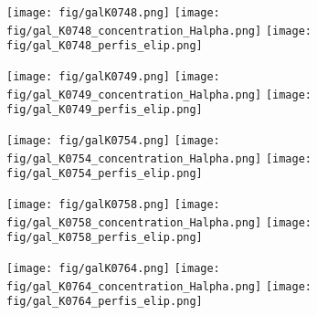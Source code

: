 \begin{figure}[!ht]
\begin{center}
\setcaptionmargin{1cm}
\texttt{[image: fig/galK0748.png]}
\texttt{[image: fig/gal\_K0748\_concentration\_Halpha.png]}
\texttt{[image: fig/gal\_K0748\_perfis\_elip.png]}
\end{center}
\end{figure}


\begin{figure}[!ht]
\begin{center}
\setcaptionmargin{1cm}
\texttt{[image: fig/galK0749.png]}
\texttt{[image: fig/gal\_K0749\_concentration\_Halpha.png]}
\texttt{[image: fig/gal\_K0749\_perfis\_elip.png]}
\end{center}
\end{figure}


\begin{figure}[!ht]
\begin{center}
\setcaptionmargin{1cm}
\texttt{[image: fig/galK0754.png]}
\texttt{[image: fig/gal\_K0754\_concentration\_Halpha.png]}
\texttt{[image: fig/gal\_K0754\_perfis\_elip.png]}
\end{center}
\end{figure}


\begin{figure}[!ht]
\begin{center}
\setcaptionmargin{1cm}
\texttt{[image: fig/galK0758.png]}
\texttt{[image: fig/gal\_K0758\_concentration\_Halpha.png]}
\texttt{[image: fig/gal\_K0758\_perfis\_elip.png]}
\end{center}
\end{figure}


\begin{figure}[!ht]
\begin{center}
\setcaptionmargin{1cm}
\texttt{[image: fig/galK0764.png]}
\texttt{[image: fig/gal\_K0764\_concentration\_Halpha.png]}
\texttt{[image: fig/gal\_K0764\_perfis\_elip.png]}
\end{center}
\end{figure}


